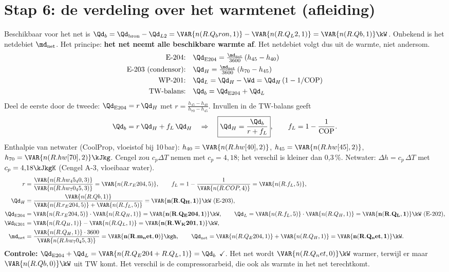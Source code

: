 \section{Stap 6: de verdeling over het warmtenet (afleiding)}
\label{s:verdeling}
Beschikbaar voor het net is $\Qd_b = \Qd_\mathrm{bron} - \Qd_{L2} = \VAR{n(R.Q_bron,1)} - \VAR{n(R.Q_L2,1)} = \VAR{n(R.Qb,1)}\kW$.
Onbekend is het netdebiet $\md_\mathrm{net}$. Het principe: \textbf{het net neemt alle beschikbare warmte af}. Het netdebiet
volgt dus uit de warmte, niet andersom.
\begin{align*}
\text{E-204:}\quad & \Qd_\mathrm{E204} = \tfrac{\md_\mathrm{net}}{3600}\,(h_{45}-h_{40}) \\
\text{E-203 (condensor):}\quad & \Qd_H = \tfrac{\md_\mathrm{net}}{3600}\,(h_{70}-h_{45}) \\
\text{WP-201:}\quad & \Qd_L = \Qd_H - \Wd = \Qd_H\,(1 - 1/\mathrm{COP}) \\
\text{TW-balans:}\quad & \Qd_b = \Qd_\mathrm{E204} + \Qd_L
\end{align*}
Deel de eerste door de tweede: $\Qd_\mathrm{E204} = r\,\Qd_H$ met $r = \frac{h_{45}-h_{40}}{h_{70}-h_{45}}$. Invullen in de
TW-balans geeft
\[
\Qd_b = r\,\Qd_H + f_L\,\Qd_H \quad\Rightarrow\quad \boxed{\Qd_H = \frac{\Qd_b}{r + f_L}},\qquad f_L = 1-\frac{1}{\mathrm{COP}}.
\]
Enthalpie van netwater (CoolProp, vloeistof bij 10\,bar): $h_{40} = \VAR{n(R.hw[40],2)}$, $h_{45} = \VAR{n(R.hw[45],2)}$,
$h_{70} = \VAR{n(R.hw[70],2)}\kJkg$. Cengel zou $c_p\Delta T$ nemen met $c_p = 4{,}18$; het verschil is kleiner dan 0,3\,\%.
Netwater: $\Delta h = c_p\,\Delta T$ met $c_p = 4{,}18\kJkgK$ (Cengel A-3, vloeibaar water).
\begin{align*}
r &= \frac{\VAR{n(R.hw_45_40,3)}}{\VAR{n(R.hw_70_45,3)}} = \VAR{n(R.r_E204,5)}, \qquad
f_L = 1 - \frac{1}{\VAR{n(R.COP,4)}} = \VAR{n(R.f_L,5)},\\
\Qd_H &= \frac{\VAR{n(R.Qb,1)}}{\VAR{n(R.r_E204,5)} + \VAR{n(R.f_L,5)}} = \mathbf{\VAR{n(R.Q_H,1)}\kW}\ (\text{E-203}),\\
\Qd_\mathrm{E204} &= \VAR{n(R.r_E204,5)}\cdot\VAR{n(R.Q_H,1)} = \mathbf{\VAR{n(R.Q_E204,1)}\kW},\qquad
\Qd_L = \VAR{n(R.f_L,5)}\cdot\VAR{n(R.Q_H,1)} = \mathbf{\VAR{n(R.Q_L,1)}\kW}\ (\text{E-202}),\\
\Wd_\mathrm{K201} &= \VAR{n(R.Q_H,1)} - \VAR{n(R.Q_L,1)} = \mathbf{\VAR{n(R.W_K201,1)}\kW},\\
\md_\mathrm{net} &= \frac{\VAR{n(R.Q_H,1)}\cdot3600}{\VAR{n(R.hw_70_45,3)}} = \mathbf{\VAR{n(R.m_net,0)}\kgh},\qquad
\Qd_\mathrm{net} = \VAR{n(R.Q_E204,1)} + \VAR{n(R.Q_H,1)} = \mathbf{\VAR{n(R.Q_net,1)}\kW}.
\end{align*}
\textbf{Controle:} $\Qd_\mathrm{E204} + \Qd_L = \VAR{n(R.Q_E204 + R.Q_L,1)} = \Qd_b$ $\checkmark$. Het net wordt
$\VAR{n(R.Q_net,0)}\kW$ warmer, terwijl er maar $\VAR{n(R.Qb,0)}\kW$ uit TW komt. Het verschil is de compressorarbeid,
die ook als warmte in het net terechtkomt.

